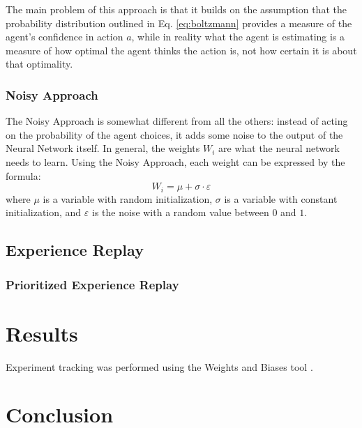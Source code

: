 \documentclass[a4paper, 12pt]{article}
\numberwithin{equation}{section}
\begin{document}
The main problem of this approach is that it builds on the assumption that the probability distribution outlined in Eq. \eqref{eq:boltzmann} provides a measure of the agent's confidence in action $a$, while in reality what the agent is estimating is a measure of how optimal the agent thinks the action is, not how certain it is about that optimality.



\subsubsection{Noisy Approach}

The Noisy Approach \cite{deep-reinforcement} is somewhat different from all the others: instead of acting on the probability of the agent choices, it adds some noise to the output of the Neural Network itself. In general, the weights $W_i$ are what the neural network needs to learn. Using the Noisy Approach, each weight can be expressed by the formula:
\begin{equation}
	W_i = \mu+\sigma\cdot\varepsilon
\end{equation}
where $\mu$ is a variable with random initialization, $\sigma$ is a variable with constant initialization, and $\varepsilon$ is the noise with a random value between $0$ and $1$.


\subsection{Experience Replay}

\subsubsection{Prioritized Experience Replay}



\section{Results}

Experiment tracking was performed using the Weights and Biases tool \cite{wandb}.


\section{Conclusion}




















\clearpage
\printbibliography[heading=bibintoc]
\end{document}
